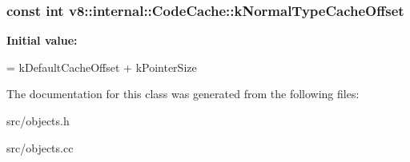 \subsubsection[{k\+Normal\+Type\+Cache\+Offset}]{\setlength{\rightskip}{0pt plus 5cm}const int v8\+::internal\+::\+Code\+Cache\+::k\+Normal\+Type\+Cache\+Offset\hspace{0.3cm}{\ttfamily [static]}}\label{classv8_1_1internal_1_1_code_cache_ad3de5d24f972e67003a07d1a0848d37c}
{\bfseries Initial value\+:}
\begin{DoxyCode}
=
      kDefaultCacheOffset + kPointerSize
\end{DoxyCode}


The documentation for this class was generated from the following files\+:\begin{DoxyCompactItemize}
\item 
src/objects.\+h\item 
src/objects.\+cc\end{DoxyCompactItemize}
